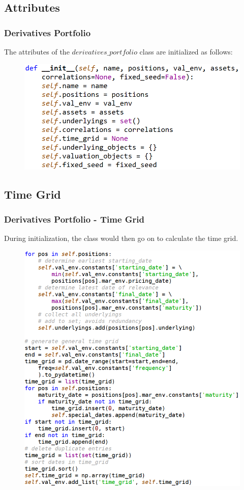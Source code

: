\documentclass{beamer}
\begin{document}
\subsection{Attributes}
\begin{frame}
\frametitle{Derivatives Portfolio}
The attributes of the $derivatives\_portfolio$ class are initialized as follows:
\begin{figure}[H]
	\includegraphics[scale=0.45]{derivatives_portfolio_attributes.png}
\end{figure}
\end{frame}

\subsection{Time Grid}
\begin{frame}
\frametitle{Derivatives Portfolio - Time Grid}
During initialization, the class would then go on to calculate the time grid.
\begin{figure}[H]
	\includegraphics[scale=0.32]{derivatives_portfolio_time_grid.png}
\end{figure}
\end{frame}
\end{document}
